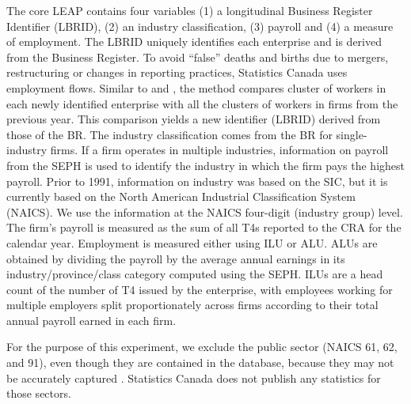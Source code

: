 The core \ac{LEAP}  contains four variables (1) a longitudinal Business Register Identifier (LBRID), (2) an industry classification, (3) payroll and (4) a measure of employment. 
%
The LBRID uniquely identifies each enterprise and is derived from the Business Register. To avoid ``false'' deaths and births due to mergers, restructuring or changes in reporting practices, Statistics Canada uses employment flows. Similar to \citet{BenedettoEtAl2007} and \citet{RePEc:iab:iabfme:201006_en}, the method  compares cluster of workers in each newly identified enterprise with all the clusters of workers in firms from the previous year. This comparison yields a new identifier (LBRID) derived from those of the \ac{BR}.
The industry classification comes from the \ac{BR} for single-industry firms. If a firm operates in multiple industries, information on payroll from the \ac{SEPH} is used to identify the industry in which the firm pays the highest payroll. Prior to 1991, information on industry was based on the SIC,  but it is currently based on the  North American Industrial Classification System (NAICS). We use the information at the NAICS four-digit (industry group) level. 
The firm's payroll is measured as the sum of all T4s  reported to the CRA for the calendar year.
Employment is measured either using \ac{ILU} or \ac{ALU}. \acp{ALU} are obtained by dividing the payroll by the average annual earnings in its industry/province/class category computed using the \ac{SEPH}. \acp{ILU} are a head count of the number of T4 issued by the enterprise, with employees working for multiple employers split proportionately across firms according to their total annual payroll earned in each firm. 



For the purpose of this experiment,  we exclude the public sector (NAICS 61, 62, and 91), even though they are contained in the database, because they may not be accurately captured \citep{StatisticsCanada2019}. Statistics Canada does not publish any statistics for those sectors.